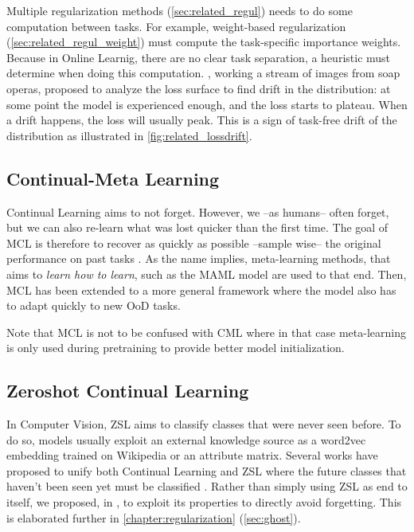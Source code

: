 Multiple regularization methods (\autoref{sec:related_regul}) needs to do some computation between
tasks. For example, weight-based regularization (\autoref{sec:related_regul_weight}) must compute
the task-specific importance weights. Because in Online Learnig, there are no clear task separation,
a heuristic must determine when doing this computation. \cite{aljundi2019taskfree}, working a stream
of images from soap operas, proposed to analyze the loss surface to find drift in the distribution:
at some point the model is experienced enough, and the loss starts to plateau. When a drift happens,
the loss will usually peak. This is a sign of task-free drift of the distribution as
illustrated in \autoref{fig:related_lossdrift}.

\subsection{Continual-Meta Learning}
\label{sec:related_meta}


Continual Learning aims to not forget. However, we --as humans-- often forget, but we can also
re-learn what was lost quicker than the first time. The goal of \ac{MCL} is therefore to recover as
quickly as possible --sample wise-- the original performance on past tasks
\citep{he2019metacontinual}. As the name implies, meta-learning methods, that aims to \textit{learn
    how to learn}, such as the MAML model \citep{finn2017maml} are used to that end. Then, \ac{MCL} has
been extended to a more general framework where the model also has to adapt quickly to new \acf{OoD}
tasks.

Note that \acf{MCL} is not to be confused with \acf{CML} where in that case meta-learning is only
used during pretraining to provide better model initialization.

\subsection{Zeroshot Continual Learning}
\label{sec:related_zeroshot}


In Computer Vision, \acf{ZSL} \citep{lampert2009zeroshot,xian2019awa2} aims to classify classes that
were never seen before. To do so, models usually exploit an external knowledge source as a word2vec
embedding \citep{mikolov2013word2vec} trained on Wikipedia or an attribute matrix. Several works
have proposed to unify both Continual Learning and \ac{ZSL} where the future classes that haven't
been seen yet must be classified
\cite{lopezpaz2017gem,wei2020lifelongzeroshot,gautam2020continualzeroshot}. Rather than simply using
\ac{ZSL} as end to itself, we proposed, in \citep{douillard2020ghost}, to exploit its properties to
directly avoid forgetting. This is elaborated further in \autoref{chapter:regularization}
(\autoref{sec:ghost}).

